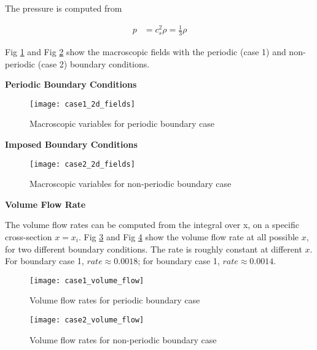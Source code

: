 \graphicspath{ {./JiaweiZhuang/HW2_figures/basic_variables/} }

\begin{solution} 

The pressure is computed from

    \begin{align*}
        p &= c_s^2 \rho= \frac{1}{3} \rho
    \end{align*}

Fig \ref{fig:macro_case1} and Fig \ref{fig:macro_case2} show the macroscopic fields with the periodic (case 1) and non-periodic (case 2) boundary conditions.

\textbf{Periodic Boundary Conditions}

\begin{figure}[H]
\texttt{[image: case1\_2d\_fields]}
\centering
\caption{Macroscopic variables for periodic boundary case}
\label{fig:macro_case1}
\end{figure}

\end{solution}

\begin{solution} 
\textbf{Imposed Boundary Conditions}

\begin{figure}[H]
\texttt{[image: case2\_2d\_fields]}
\centering
\caption{Macroscopic variables for non-periodic boundary case}
\label{fig:macro_case2}
\end{figure}

\end{solution}

\begin{solution} 
\textbf{Volume Flow Rate}

The volume flow rates can be computed from the integral over x, on a specific cross-section $x=x_i$. Fig \ref{fig:flow_case1} and Fig \ref{fig:flow_case2} show the volume flow rate at all possible $x$, for two different boundary conditions. The rate is roughly constant at different $x$. For boundary case 1, $rate \approx 0.0018$; for boundary case 1, $rate \approx 0.0014$.

\begin{figure}[H]
\texttt{[image: case1\_volume\_flow]}
\centering
\caption{Volume flow rates for periodic boundary case}
\label{fig:flow_case1}
\end{figure}

\begin{figure}[H]
\texttt{[image: case2\_volume\_flow]}
\centering
\caption{Volume flow rates for non-periodic boundary case}
\label{fig:flow_case2}
\end{figure}

\end{solution}

